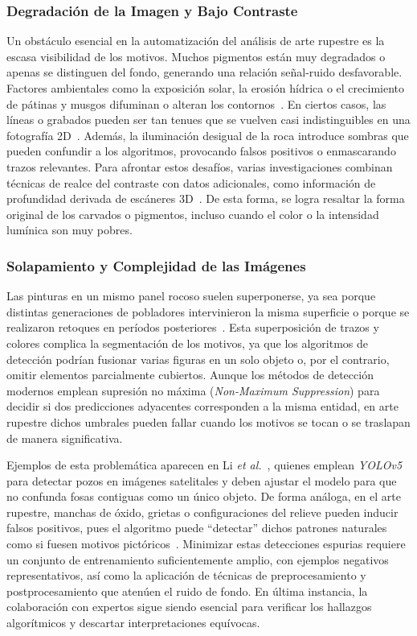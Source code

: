 \subsubsection*{Degradación de la Imagen y Bajo Contraste}

Un obstáculo esencial en la automatización del análisis de arte rupestre es la escasa visibilidad de los motivos. Muchos pigmentos están muy degradados o apenas se distinguen del fondo, generando una relación señal-ruido desfavorable. Factores ambientales como la exposición solar, la erosión hídrica o el crecimiento de pátinas y musgos difuminan o alteran los contornos~\cite{horn2022,suhaimi2023}. En ciertos casos, las líneas o grabados pueden ser tan tenues que se vuelven casi indistinguibles en una fotografía 2D~\cite{horn2022}. Además, la iluminación desigual de la roca introduce sombras que pueden confundir a los algoritmos, provocando falsos positivos o enmascarando trazos relevantes. Para afrontar estos desafíos, varias investigaciones combinan técnicas de realce del contraste con datos adicionales, como información de profundidad derivada de escáneres 3D~\cite{jalandoni2022}. De esta forma, se logra resaltar la forma original de los carvados o pigmentos, incluso cuando el color o la intensidad lumínica son muy pobres.

\subsubsection*{Solapamiento y Complejidad de las Imágenes}

Las pinturas en un mismo panel rocoso suelen superponerse, ya sea porque distintas generaciones de pobladores intervinieron la misma superficie o porque se realizaron retoques en períodos posteriores~\cite{horn2022}. Esta superposición de trazos y colores complica la segmentación de los motivos, ya que los algoritmos de detección podrían fusionar varias figuras en un solo objeto o, por el contrario, omitir elementos parcialmente cubiertos. Aunque los métodos de detección modernos emplean supresión no máxima (\textit{Non-Maximum Suppression}) para decidir si dos predicciones adyacentes corresponden a la misma entidad, en arte rupestre dichos umbrales pueden fallar cuando los motivos se tocan o se traslapan de manera significativa.

Ejemplos de esta problemática aparecen en Li \textit{et al.}~\cite{li2022}, quienes emplean \textit{YOLOv5} para detectar pozos en imágenes satelitales y deben ajustar el modelo para que no confunda fosas contiguas como un único objeto. De forma análoga, en el arte rupestre, manchas de óxido, grietas o configuraciones del relieve pueden inducir falsos positivos, pues el algoritmo puede “detectar” dichos patrones naturales como si fuesen motivos pictóricos~\cite{horn2022}. Minimizar estas detecciones espurias requiere un conjunto de entrenamiento suficientemente amplio, con ejemplos negativos representativos, así como la aplicación de técnicas de preprocesamiento y postprocesamiento que atenúen el ruido de fondo. En última instancia, la colaboración con expertos sigue siendo esencial para verificar los hallazgos algorítmicos y descartar interpretaciones equívocas.

